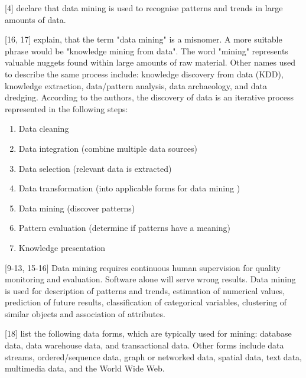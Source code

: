 \textcite{DataMiningAndPredictiveAnalytics}[4] declare that data mining is used to recognise patterns and trends in large amounts of data.

\textcite{han2011data}[16, 17] explain, that the term "data mining" is a misnomer. A more suitable phrase would be "knowledge mining from data". The word "mining" represents valuable nuggets found within large amounts of raw material. Other names used to describe the same process include: knowledge discovery from data (KDD), knowledge extraction, data/pattern analysis, data archaeology, and data dredging.
According to the authors, the discovery of data is an iterative process represented in the following steps:

\begin{enumerate}
  \item Data cleaning
  \item Data integration (combine multiple data sources)
  \item Data selection (relevant data is extracted)
  \item Data transformation (into applicable forms for data mining )
  \item Data mining (discover patterns)
  \item Pattern evaluation (determine if patterns have a meaning)
  \item Knowledge presentation
\end{enumerate}

\textcite{DataMiningAndPredictiveAnalytics}[9-13, 15-16] Data mining requires continuous human supervision for quality monitoring and evaluation. Software alone will serve wrong results. Data mining is used for description of patterns and trends, estimation of numerical values, prediction of future results, classification of categorical variables, clustering of similar objects and association of attributes.

\textcite{han2011data}[18] list the following data forms, which are typically used for mining: database data, data warehouse data, and transactional data. Other forms include data streams, ordered/sequence data, graph or networked data, spatial data, text data, multimedia data, and the World Wide Web.



